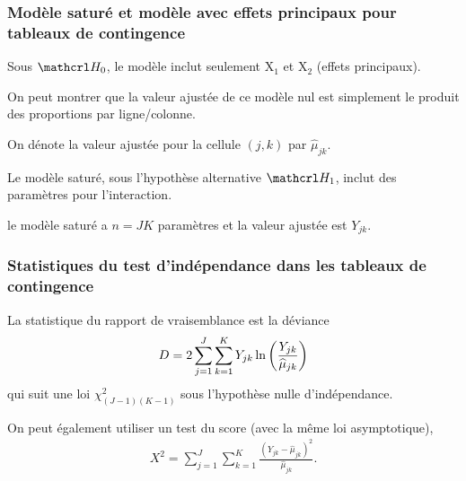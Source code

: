 \documentclass{beamer}
\begin{document}
\begin{frame}
 \frametitle{Modèle saturé et modèle avec effets principaux pour tableaux de contingence}
 \bi \item Sous $\Hy_0$, le modèle inclut seulement $\mathrm{X}_1$ et $\mathrm{X}_2$ (effets principaux). 
  \bi 
  \item On peut montrer que la valeur ajustée de ce modèle nul est simplement le produit des proportions par ligne/colonne. 
  \item On dénote la valeur ajustée pour la cellule $(j,k)$ par $\hat{\mu}_{jk}$.
  \ei
  \item Le modèle saturé, sous l'hypothèse alternative $\Hy_1$, inclut des paramètres pour l'interaction.
    \bi \item le modèle saturé a $n=JK$ paramètres et la valeur ajustée est $Y_{jk}$.
\ei 
\ei 
\end{frame}
\begin{frame}
 \frametitle{Statistiques du test d'indépendance dans les tableaux de contingence}
    \bi 
  \item La statistique du rapport de vraisemblance est la déviance 
  \begin{align*}
   D= 2 \sum_{j=1}^J \sum_{k=1}^K Y_{jk}\ln \left(\frac{Y_{jk}}{\widehat{\mu}_{jk}}\right)
  \end{align*}
qui suit une loi $\chi^2_{(J-1)(K-1)}$ sous l'hypothèse nulle d'indépendance.
\item On peut également utiliser un test du score (avec la même loi asymptotique),
\begin{align*}
 X^2 = \sum_{j=1}^J \sum_{k=1}^K \frac{(Y_{jk}-\hat{\mu}_{jk})^2}{\hat{\mu}_{jk}}.
\end{align*}

  \ei 
\end{frame}
\end{document}
